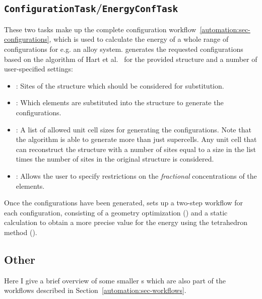 \begin{refsection}
\subsection{\texttt{ConfigurationTask}/\texttt{EnergyConfTask}} 
\label{automation:sec-ConfigurationTask} \label{automation:sec-EnergyConfTask} 
 
These two tasks make up the complete configuration 
workflow~\ref{automation:sec-configurations}, which is used to calculate the 
energy of a whole range of configurations for e.g. an alloy system. 
 generates the requested configurations based on the 
algorithm of Hart et al.~\cite{Hart2005} for the provided structure and a 
number of user-specified settings: 
 
\begin{itemize} 
\item {}: Sites of the structure which should 
be considered for substitution. 
\item {}: Which elements are substituted into the 
structure to generate the configurations. 
\item {} : A list of allowed unit cell sizes for generating 
the configurations. Note that the algorithm is able to generate more than just 
supercells. Any unit cell that can reconstruct the structure with a number of 
sites equal to a size in the list times the number of sites in the original 
structure is considered. 
\item {}: Allows the user to specify 
restrictions on the \textit{fractional} concentrations of the elements. 
\end{itemize} 
 
Once the configurations have been generated,  sets up a 
two-step workflow for each configuration, consisting of a geometry 
optimization () and a static calculation to obtain a more 
precise value for the energy using the tetrahedron method (). 
 
\subsection{Other} 
 
Here I give a brief overview of some smaller s which are also 
part of the workflows described in Section~\ref{automation:sec-workflows}.  
 
\begin{itemize} 
 

\end{itemize}
\end{refsection}
